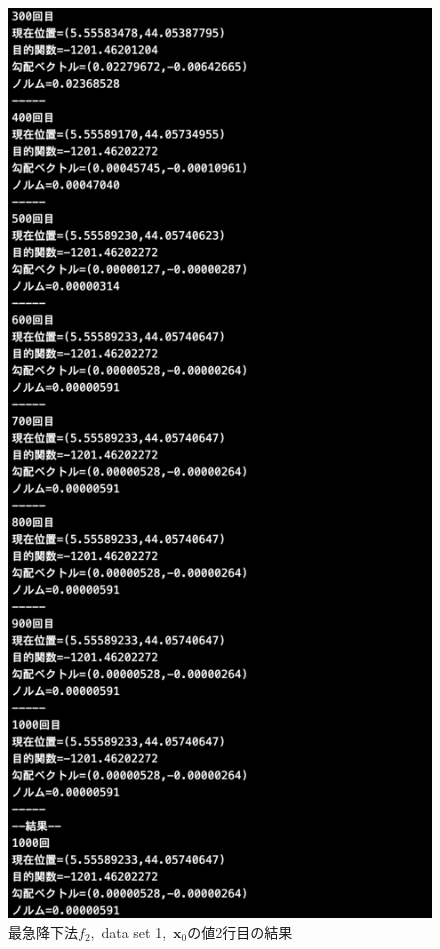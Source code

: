 \documentclass[12pt]{jarticle}
\begin{document}
\begin{figure}[h]
\begin{minipage}{0.5\hsize}
    \end{minipage}
    \begin{minipage}{0.5\hsize}
        \begin{center}
            \includegraphics[scale=0.2]{kadai1_2s_out1_2_3.png}
        \end{center}
    \end{minipage}
    \caption{最急降下法$f_2$,\ data set 1,\ $\boldsymbol{x}_0$の値2行目の結果}
\end{figure}
\end{document}
